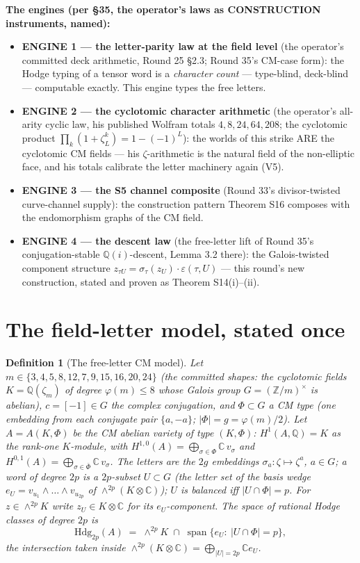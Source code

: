\documentclass[11pt]{article}
\newtheorem{definition}[theorem]{Definition}
\newcommand{\Z}{\mathbb{Z}}
\newcommand{\Q}{\mathbb{Q}}
\newcommand{\C}{\mathbb{C}}
\newcommand{\spann}{\operatorname{span}}
\newcommand{\Hdg}{\mathrm{Hdg}}
\begin{document}
\textbf{The engines (per \S35, the operator's laws as CONSTRUCTION
instruments, named):}
\begin{itemize}
\item \textbf{ENGINE 1 --- the letter-parity law at the field level} (the
operator's committed deck arithmetic, Round 25 \S2.3; Round 35's CM-case form):
the Hodge typing of a tensor word is a \emph{character count} --- type-blind,
deck-blind --- computable exactly. This engine types the free letters.
\item \textbf{ENGINE 2 --- the cyclotomic character arithmetic} (the operator's
all-arity cyclic law, his published Wolfram totals $4,8,24,64,208$; the cyclotomic
product $\prod_k(1+\zeta_L^k)=1-(-1)^L$): the worlds of this strike ARE the
cyclotomic CM fields --- his $\zeta$-arithmetic is the natural field of the
non-elliptic face, and his totals calibrate the letter machinery again (V5).
\item \textbf{ENGINE 3 --- the S5 channel composite} (Round 33's divisor-twisted
curve-channel supply): the construction pattern Theorem S16 composes with the
endomorphism graphs of the CM field.
\item \textbf{ENGINE 4 --- the descent law} (the free-letter lift of Round 35's
conjugation-stable $\Q(i)$-descent, Lemma 3.2 there): the Galois-twisted
component structure $z_{\tau U}=\sigma_\tau(z_U)\cdot\varepsilon(\tau,U)$ ---
this round's new construction, stated and proven as Theorem S14(i)--(ii).
\end{itemize}

\section{The field-letter model, stated once}

\begin{definition}[The free-letter CM model]\label{def:fieldletters}
Let $m\in\{3,4,5,8,12,7,9,15,16,20,24\}$ (the \emph{committed shapes}: the
cyclotomic fields $K=\Q(\zeta_m)$ of degree $\varphi(m)\le 8$ whose Galois group
$G=(\Z/m)^\times$ is abelian), $c=[-1]\in G$ the complex conjugation, and
$\Phi\subset G$ a \emph{CM type} (one embedding from each conjugate pair
$\{a,-a\}$; $|\Phi|=g=\varphi(m)/2$). Let $A=A(K,\Phi)$ be the CM abelian
variety of type $(K,\Phi)$: $H^1(A,\Q)=K$ as the rank-one $K$-module, with
$H^{1,0}(A)=\bigoplus_{\sigma\in\Phi}\C\,v_\sigma$ and
$H^{0,1}(A)=\bigoplus_{\sigma\in\bar\Phi}\C\,v_\sigma$. The \emph{letters} are the
$2g$ embeddings $\sigma_a\colon\zeta\mapsto\zeta^a$, $a\in G$; a \emph{word of
degree $2p$} is a $2p$-subset $U\subset G$ (the letter set of the basis wedge
$e_U=v_{u_1}\wedge\dots\wedge v_{u_{2p}}$ of $\wedge^{2p}(K\otimes\C)$); $U$ is
\emph{balanced} iff $\left|U\cap\Phi\right|=p$. For $z\in\wedge^{2p}K$ write
$z_U\in K\otimes\C$ for its $e_U$-component. The space of rational Hodge classes
of degree $2p$ is
\[
\Hdg_{2p}(A)\;=\;\wedge^{2p}K\;\cap\;\spann\{e_U:\ \left|U\cap\Phi\right|=p\},
\]
the intersection taken inside $\wedge^{2p}(K\otimes\C)=\bigoplus_{\left|U\right|=2p}\C e_U$.
\end{definition}
\end{document}
